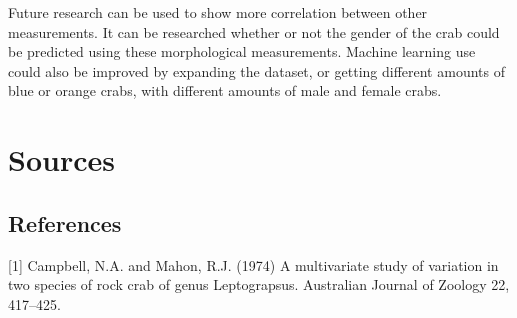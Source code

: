 \documentclass[
]{article}
\begin{document}
Future research can be used to show more correlation between other
measurements. It can be researched whether or not the gender of the crab
could be predicted using these morphological measurements. Machine
learning use could also be improved by expanding the dataset, or getting
different amounts of blue or orange crabs, with different amounts of
male and female crabs.

\newpage

\hypertarget{sources}{%
\section{Sources}\label{sources}}

\hypertarget{references}{%
\subsection{References}\label{references}}

{[}1{]} Campbell, N.A. and Mahon, R.J. (1974) A multivariate study of
variation in two species of rock crab of genus Leptograpsus. Australian
Journal of Zoology 22, 417--425.
\end{document}
